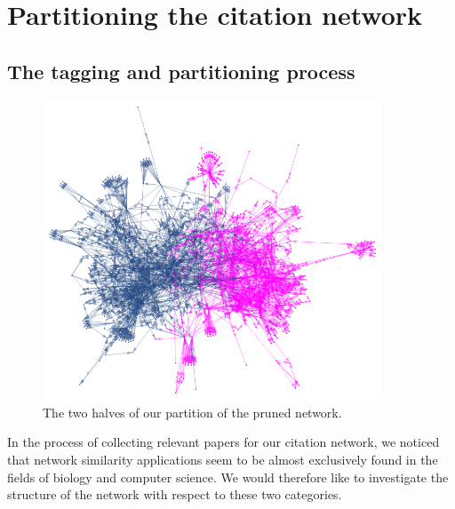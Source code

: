 \documentclass[12pt]{thesis}
\theoremstyle{plain}
\theoremstyle{definition}
\theoremstyle{remark}
\begin{document}









\chapter{Partitioning the citation network}\label{chapter:partitioning}

\section{The tagging and partitioning process}

\begin{figure}[h]
\centering
\includegraphics[width=0.9\textwidth]{subnetwork_partition.png}
\caption{The two halves of our partition of the pruned network.}
\label{fig:partitioned_network}
\end{figure}

In the process of collecting relevant papers for our citation network, we noticed that network similarity applications seem to be almost exclusively found in the fields of biology and computer science. We would therefore like to investigate the structure of the network with respect to these two categories. 

\end{document}
